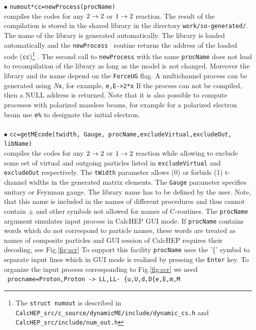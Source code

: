 \documentclass[12pt,a4paper]{article}
\begin{document}
\noindent
$\bullet$ \verb|numout*cc=newProcess(procName)|\\
compiles the  codes for any $2\rightarrow 2$ or  $1\rightarrow 2$  reaction.
The result of the compilation is stored in the  shared library  in the directory \verb|work/so-generated/|. The name of the library is generated
automatically.  The library  is loaded automatically and  the {\tt newProcess } routine returns the  address of the loaded code ({\tt cc})\footnote{ The {\tt struct numout} is described in 
{\tt CalcHEP\_src/c\_source/dynamicME/include/dynamic\_cs.h}  
and 
{\tt CalcHEP\_src/include/num\_out.h}
} . The  second call to {\tt newProcess} with the same {\tt procName}  does not lead to  recompilation of the library as long as   the model is  not changed.  Moreover the library and its name depend on the {\tt ForceUG} flag.
  A multichannel process can be generated using  {\it N}{\tt*x}, for example, {\tt e,E->2*x}  
If the process can not be compiled, then a NULL address is
returned.  
Note that it is also possible to compute processes with polarized massless beams, 
for example for a polarized electron beam use \verb|e%|
 to designate the initial electron.\\[2mm]
%
\\

$\bullet$ \verb|cc=getMEcode(twidth, Gauge, procName,excludeVirtual,excludeOut, libName)|\\
compiles the  codes for any $2\rightarrow 2$ or  $1\rightarrow 2$  reaction while allowing
 to exclude some  set of  virtual  and outgoing  particles listed in {\tt excludeVirtual} and {\tt excludeOut} respectively. 
 The {\tt tWidth} parameter allows (0) or forbids (1)  t-channel widths in  the generated matrix elements. The {\tt Gauge} parameter specifies unitary or Feynman gauge.
 The library name has to be defined by the user.  Note, that this name is included in the names of different procedures and thus  cannot contain $\pm$ and other symbols  not allowed for names of C-routines.
 The {\tt procName} argument simulates  input process in CalcHEP GUI mode. 
If {\tt procName} contains words which do not correspond to particle names, these words are treated as names of composite particles and GUI session of CalcHEP requires their decoding, see Fig.\ref{fig:scr}
To support this facility  {\tt procName} uses the '\{' symbol to separate input lines which in GUI mode is realized by  pressing  the {\tt Enter} key. To organize the input process corresponding to Fig.\ref{fig:scr} we need \\
\verb| procname=Proton,Proton -> LL,LL- {u,U,d,D{e,E,m,M |\\ 
\end{document}
